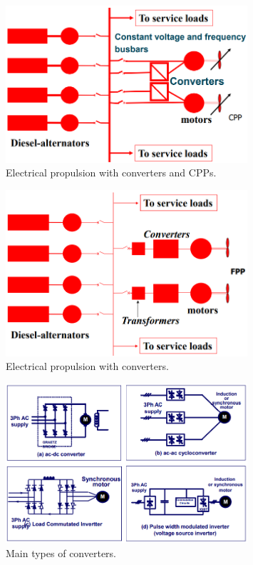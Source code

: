 \begin{figure}[H]
    \centering
    \includegraphics[width = 0.8\textwidth]{img/figure61.png}
    \caption{Electrical propulsion with converters and CPPs.}
\end{figure}

\begin{figure}[H]
    \centering
    \includegraphics[width = 0.8\textwidth]{img/figure62.png}
    \caption{Electrical propulsion with converters.}
\end{figure}

\begin{figure}[H]
    \centering
    \includegraphics[width = 0.8\textwidth]{img/figure63.png}
    \caption{Main types of converters.}
\end{figure}

